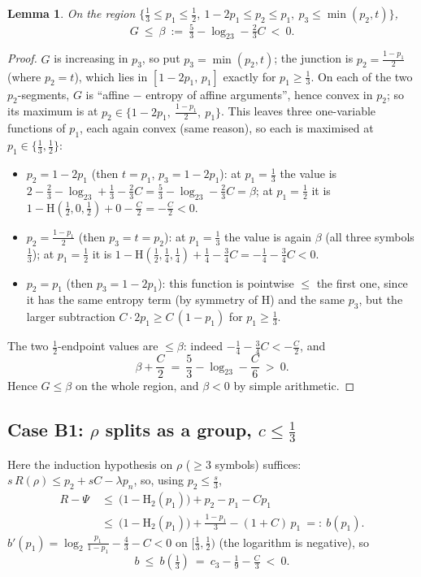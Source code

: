 \documentclass[journal]{IEEEtran}
\newtheorem{lemma}{Lemma}
\theoremstyle{definition}
\newcommand{\Hh}{\mathrm H_2}
\newcommand{\lgg}{\log_2}
\newcommand{\CC}{C}
\newcommand{\lam}{\lambda}
\newcommand{\cthree}{c_3}
\begin{document}
\begin{lemma}\label{lem:caseA}
On the region
$\bigl\{\tfrac13\le p_1\le\tfrac12,\ 1-2p_1\le p_2\le p_1,\
p_3\le\min(p_2,t)\bigr\}$,
\[
  G\ \le\ \beta\ :=\ \tfrac53-\lgg3-\tfrac23\CC\ <\ 0 .
\]
\end{lemma}

\begin{proof}
$G$ is increasing in $p_3$, so put $p_3=\min(p_2,t)$; the junction is
$p_2=\tfrac{1-p_1}2$ (where $p_2=t$), which lies in $[1-2p_1,\,p_1]$ exactly for
$p_1\ge\tfrac13$. On each of the two $p_2$-segments, $G$ is
``affine $-$ entropy of affine arguments'', hence convex in $p_2$; so its
maximum is at $p_2\in\{1-2p_1,\ \tfrac{1-p_1}2,\ p_1\}$. This leaves three
one-variable functions of $p_1$, each again convex (same reason), so each is
maximised at $p_1\in\{\tfrac13,\tfrac12\}$:
\begin{itemize}
\item $p_2=1-2p_1$ (then $t=p_1$, $p_3=1-2p_1$):
  at $p_1=\tfrac13$ the value is
  $2-\tfrac23-\lgg3+\tfrac13-\tfrac23\CC=\tfrac53-\lgg3-\tfrac23\CC=\beta$;
  at $p_1=\tfrac12$ it is $1-\mathrm H(\tfrac12,0,\tfrac12)+0-\tfrac{\CC}2
  =-\tfrac{\CC}2<0$.
\item $p_2=\tfrac{1-p_1}2$ (then $p_3=t=p_2$):
  at $p_1=\tfrac13$ the value is again $\beta$ (all three symbols
  $\tfrac13$); at $p_1=\tfrac12$ it is
  $1-\mathrm H(\tfrac12,\tfrac14,\tfrac14)+\tfrac14-\tfrac34\CC
  =-\tfrac14-\tfrac34\CC<0$.
\item $p_2=p_1$ (then $p_3=1-2p_1$): this function is pointwise $\le$ the first
  one, since it has the same entropy term (by symmetry of $\mathrm H$) and the
  same $p_3$, but the larger subtraction $\CC\cdot2p_1\ge\CC\,(1-p_1)$ for
  $p_1\ge\tfrac13$.
\end{itemize}
The two $\tfrac12$-endpoint values are $\le\beta$: indeed
$-\tfrac14-\tfrac34\CC<-\tfrac{\CC}2$, and
\[
  \beta+\frac{\CC}2\ =\ \frac53-\lgg3-\frac{\CC}6\ >\ 0 .
\]
Hence $G\le\beta$ on the whole region, and $\beta<0$ by simple arithmetic.
\end{proof}

\subsection*{Case B1: $\rho$ splits as a group, $c\le\tfrac13$}

Here the induction hypothesis on $\rho$ ($\ge3$ symbols) suffices:
$s\,R(\rho)\le p_2+s\CC-\lam p_n$, so, using $p_2\le\tfrac s3$,
\[
\begin{aligned}
  R-\Psi\ &\le\ \bigl(1-\Hh(p_1)\bigr)+p_2-p_1-\CC p_1\\
  &\le\ \bigl(1-\Hh(p_1)\bigr)+\tfrac{1-p_1}3-(1+\CC)\,p_1\ =:\ b(p_1).
\end{aligned}
\]
$b'(p_1)=\lgg\tfrac{p_1}{1-p_1}-\tfrac43-\CC<0$ on $[\tfrac13,\tfrac12)$ (the
logarithm is negative), so
\[
  b\ \le\ b(\tfrac13)\ =\ \cthree-\tfrac19-\tfrac{\CC}3
  \ <\ 0.
\]
\end{document}
